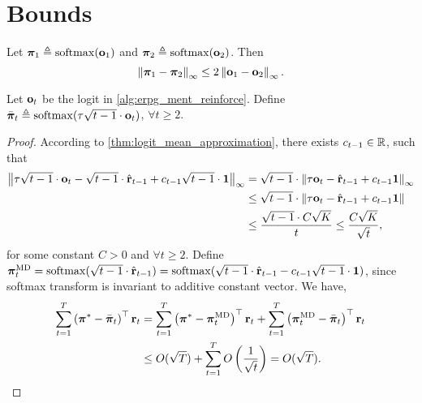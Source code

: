 \section{Bounds}

\begin{lem}
\label{lem:policy_logit_inequality}
Let ${\boldsymbol{\pi}}_1 \triangleq \mathrm{softmax}({\mathbf{o}}_1)$ and ${\boldsymbol{\pi}}_2 \triangleq \mathrm{softmax}({\mathbf{o}}_2)$. Then
\begin{equation*}
    \left\| {\boldsymbol{\pi}}_1 - {\boldsymbol{\pi}}_2 \right\|_\infty \le  2 \left\| {\mathbf{o}}_1 - {\mathbf{o}}_2 \right\|_\infty.
\end{equation*}
\end{lem}

\begin{thm}
Let ${\mathbf{o}}_t$ be the logit in \cref{alg:erpg_ment_reinforce}. Define $\bar{{\boldsymbol{\pi}}}_t \triangleq \mathrm{softmax}(\tau \sqrt{t-1} \cdot {\mathbf{o}}_t)$, $\forall t \ge 2$.
\end{thm}
\begin{proof}
According to \cref{thm:logit_mean_approximation}, there exists $c_{t-1} \in {\mathbb{R}}$, such that
\begin{equation*}
\begin{split}
    \left\| \tau \sqrt{t-1} \cdot {\mathbf{o}}_t - \sqrt{t-1} \cdot \hat{{\mathbf{r}}}_{t-1} + c_{t-1} \sqrt{t-1} \cdot {\mathbf{1}} \right\|_\infty &= \sqrt{t-1} \cdot \left\| \tau {\mathbf{o}}_t - \hat{{\mathbf{r}}}_{t-1} + c_{t-1} {\mathbf{1}} \right\|_\infty \\
    &\le \sqrt{t-1} \cdot \left\| \tau {\mathbf{o}}_t - \hat{{\mathbf{r}}}_{t-1} + c_{t-1} {\mathbf{1}} \right\| \\
    &\le \frac{\sqrt{t-1} \cdot C \sqrt{K}}{t} \le \frac{C \sqrt{K}}{\sqrt{t}},
\end{split}
\end{equation*}
for some constant $C > 0$ and $\forall t \ge 2$. Define ${\boldsymbol{\pi}}_t^{\text{MD}} = \mathrm{softmax}(\sqrt{t-1} \cdot \hat{{\mathbf{r}}}_{t-1}) = \mathrm{softmax}(\sqrt{t-1} \cdot \hat{{\mathbf{r}}}_{t-1} - c_{t-1} \sqrt{t-1} \cdot {\mathbf{1}})$, since softmax transform is invariant to additive constant vector. We have,
\begin{equation*}
\begin{split}
    \sum\limits_{t=1}^{T}{ \left( {\boldsymbol{\pi}}^* - \bar{{\boldsymbol{\pi}}}_t \right)^\top {\mathbf{r}}_t} &= \sum\limits_{t=1}^{T}{ \left( {\boldsymbol{\pi}}^* - {\boldsymbol{\pi}}_{t}^{\text{MD}} \right)^\top {\mathbf{r}}_t} + \sum\limits_{t=1}^{T}{ \left( {\boldsymbol{\pi}}_{t}^{\text{MD}} - \bar{{\boldsymbol{\pi}}}_t \right)^\top {\mathbf{r}}_t} \\
    &\le O(\sqrt{T}) + \sum\limits_{t=1}^{T}{ O\left( \frac{1}{\sqrt{t}} \right) } = O(\sqrt{T}). \qedhere
\end{split}
\end{equation*}
\end{proof}
